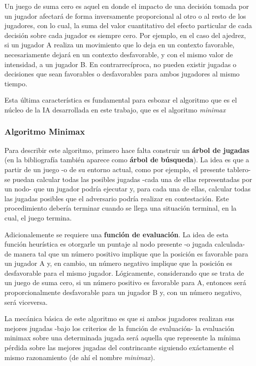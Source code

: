 \documentclass{llncs}
\begin{document}
Un juego de suma cero es aquel en donde el impacto de una decisión tomada por un jugador afectará de forma inversamente proporcional al otro o al resto de los jugadores, con lo cual, la suma del valor cuantitativo del efecto particular de cada decisión sobre cada jugador es siempre cero. Por ejemplo, en el caso del ajedrez, si un jugador A realiza un movimiento que lo deja en un contexto favorable, necesariamente dejará en un contexto desfavorable, y con el mismo valor de intensidad, a un jugador B. En contrarrecíproca, no pueden existir jugadas o decisiones que sean favorables o desfavorables para ambos jugadores al mismo tiempo.

Esta última característica es fundamental para esbozar el algoritmo que es el núcleo de la IA desarrollada en este trabajo, que es el algoritmo \textit{minimax}

\subsubsection{ Algoritmo Minimax }

Para describir este algoritmo, primero hace falta construir un \textbf{árbol de jugadas} (en la bibliografía también aparece como \textbf{árbol de búsqueda}). La idea es que a partir de un juego -o de su entorno actual, como por ejemplo, el presente tablero- se puedan calcular todas las posibles jugadas -cada una de ellas representadas por un nodo- que un jugador podría ejecutar y, para cada una de ellas, calcular todas las jugadas posibles que el adversario podría realizar en contestación. Este procedimiento debería terminar cuando se llega una situación terminal, en la cual, el juego termina.

Adicionalemente se requiere una \textbf{función de evaluación}. La idea de esta función heurística es otorgarle un puntaje al nodo presente -o jugada calculada- de manera tal que un número positivo implique que la posición es favorable para un jugador A y, en cambio, un número negativo implique que la posición es desfavorable para el mismo jugador. Lógicamente, considerando que se trata de un juego de suma cero, si un número positivo es favorable para A, entonces será proporcionalmente desfavorable para un jugador B y, con un número negativo, será viceversa.

La mecánica básica de este algoritmo es que si ambos jugadores realizan sus mejores jugadas -bajo los criterios de la función de evaluación- la evaluación minimax sobre una determinada jugada será aquella que represente la mínima pérdida sobre las mejores jugadas del contrincante siguiendo exáctamente el mismo razonamiento (de ahí el nombre \textit{minimax}).
\end{document}

